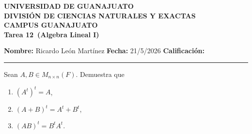 \documentclass[12pt,a4paper]{article}
\newcommand{\alumno}{Ricardo León Martínez}
\newcommand{\materia}{Algebra Lineal I}
\newcommand{\tarea}{Tarea 12}
\newcommand{\fecha}{21/5/2026}
\begin{document}
    \begin{center}
        {\large\textbf{UNIVERSIDAD DE GUANAJUATO}}\\[0.3cm]
        {\normalsize\textbf{DIVISIÓN DE CIENCIAS NATURALES Y EXACTAS}}\\
        {\normalsize\textbf{CAMPUS GUANAJUATO}}\\[1cm]

        {\Large\textbf{\tarea\ (\materia)}}\\[1cm]
    \end{center}

    \noindent
    \textbf{Nombre:} \alumno 
    \hfill 
    \textbf{Fecha:} \fecha 
    \hfill 
    \textbf{Calificación:} \rule{3cm}{0.4pt}

    \vspace{0.3cm}

    \begin{mdframed}[style=mdpinkbox,frametitle={Ejercicio 1}]
        Sean $A,B\in M_{n\times n}(F)$. Demuestra que
        \begin{enumerate}
            \item[(a)] $(A^{t})^{t}=A$,
            \item[(b)] $(A+B)^{t}=A^{t}+B^{t}$,
            \item[(c)] $(AB)^{t}=B^{t}A^{t}$.  
        \end{enumerate}
    \end{mdframed}
\end{document}
